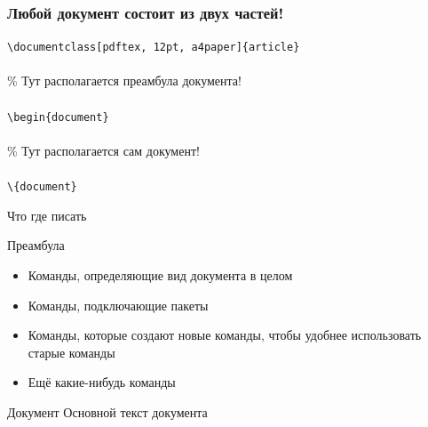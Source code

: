 \documentclass[newPxFont]{beamer}
\begin{document}
\begin{frame}[fragile]
\frametitle{Любой документ состоит из двух частей!} 
\begin{mdframed}[backgroundcolor=LTXLightGreen] 
\verb|\documentclass[pdftex, 12pt, a4paper]{article}|\\
\\
\% Тут располагается преамбула документа!\\
\\
\verb|\begin{document}|\\
\\
\% Тут располагается сам документ!\\
\\
\verb|\{document}|\\
\end{mdframed}    
\end{frame}



\begin{frame}{Что где писать}
\begin{block}{Преамбула}
\begin{itemize}
\item Команды, определяющие вид документа в целом
\item Команды, подключающие пакеты
\item Команды, которые создают новые команды, чтобы удобнее использовать старые команды
\item Ещё какие-нибудь команды
\end{itemize}
\end{block}

\begin{block}{Документ}
Основной текст документа
\end{block}
\end{frame}
\end{document}
